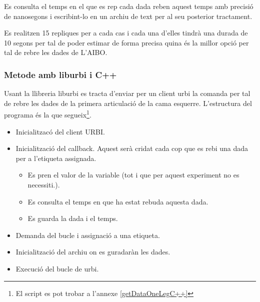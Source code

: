 \documentclass[12pt,a4paper,final,twoside]{article}
\begin{document}
Es consulta el temps en el que es rep cada dada reben aquest temps amb precisió de nanosegons i escribint-lo   en un archiu de text per al seu posterior tractament.

Es realitzen 15 repliques per a cada cas i cada una d'elles tindrà una durada de 10 segons per tal de poder estimar de forma precisa quina és la millor opció per tal de rebre les dades de L'AIBO.

\subsubsection{Metode amb liburbi i C++}

Usant la llibreria liburbi es tracta d'enviar per un client urbi la comanda per tal de rebre les dades de la primera articulació de la cama esquerre. 
L'estructura del programa és la que segueix\footnote{El script es pot trobar a l'annexe \ref{getDataOneLegC++}}.
\begin{itemize}
\item Inicialitzacó del client URBI.
\item Inicialització del callback. 
Aquest serà cridat cada cop que es rebi una dada per a l'etiqueta assignada.
\begin{itemize}
\item Es pren el valor de la variable (tot i que per aquest experiment no es necessiti.).
\item Es consulta el temps en que ha estat rebuda aquesta dada.
\item Es guarda la dada i el temps.
\end{itemize}
\item Demanda del bucle i assignació a una etiqueta.
\item Inicialització del archiu on es guradaràn les dades.
\item  Execució del bucle de urbi. 
\end{itemize}



\end{document}
